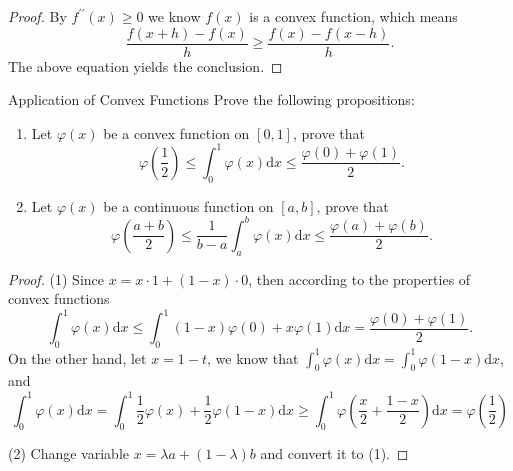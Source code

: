 \begin{proof}
  By $f^{\prime\prime}(x) \geq 0$ we know $f(x)$ is a convex function,
  which means
  \begin{equation}
    \frac{f(x+h) - f(x)}{h} \geq \frac{f(x) - f(x-h)}{h}.
  \end{equation}
  The above equation yields the conclusion.
\end{proof}

\begin{example}{Application of Convex Functions}{}
  Prove the following propositions:
  \begin{enumerate}
  \item Let $\varphi(x)$ be a convex function on $[0, 1]$, prove that
    \begin{equation}
      \varphi (\frac{1}{2}) \leq \int_0^1\varphi(x)\mathrm{d} x \leq \frac{\varphi(0) + \varphi(1)}{2}.
    \end{equation}
  \item Let $\varphi(x)$ be a continuous function on $[a, b]$, prove that
    \begin{equation}
      \varphi (\frac{a+b}{2}) \leq \frac{1}{b-a} \int_a^b \varphi(x)\mathrm{d} x \leq \frac{\varphi(a) + \varphi(b)}{2}.
    \end{equation}
  \end{enumerate}
\end{example}

\begin{proof}
  (1) Since $x = x \cdot 1 + (1 - x) \cdot 0$, then according to the properties
  of convex functions
  \begin{equation}
    \int_0^1 \varphi(x)\mathrm{d} x \leq
    \int_0^1 (1-x)\varphi(0) + x\varphi(1)\mathrm{d} x = 
    \frac{\varphi(0) + \varphi(1)}{2}.
  \end{equation}
  On the other hand, let $x = 1 - t$,
  we know that $\int_0^1 \varphi(x)\mathrm{d} x = \int_0^1
  \varphi(1-x)\mathrm{d} x$, and
  \begin{equation}
    \int_0^1\varphi(x)\mathrm{d}x=\int_0^1\frac{1}{2}\varphi(x)+\frac{1}{2}\varphi(1-x)\mathrm{d}x\geq\int_0^1\varphi\left(\frac{x}{2}+\frac{1-x}{2}\right)\mathrm{d}x=\varphi\left(\frac{1}{2}\right)
  \end{equation}

  (2) Change variable $x = \lambda a + (1-\lambda)b$ and convert it to (1).
\end{proof}


